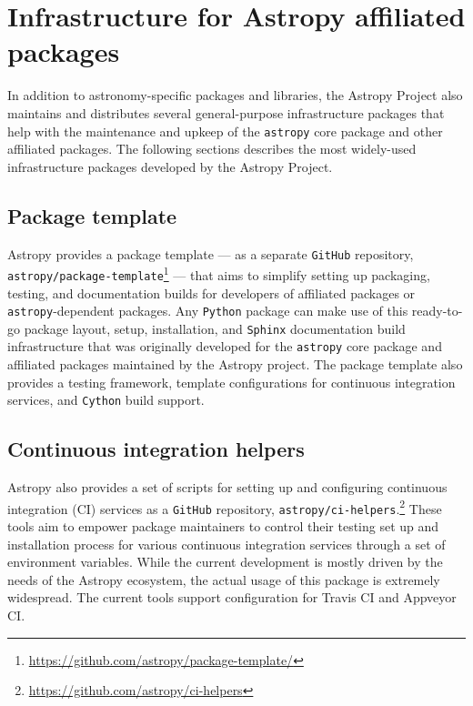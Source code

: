 \documentclass[modern]{aastex61}
\newcommand{\package}[1]{\texttt{#1}\xspace}
\newcommand{\github}{\package{GitHub}}
\newcommand{\python}{\package{Python}}
\newcommand{\astropy}{Astropy\xspace}
\newcommand{\astropypkg}{\package{astropy}}
\newcommand{\inlinecomment}[2]{\todo[inline]{#1: #2}\xspace}
\begin{document}
\section{Infrastructure for Astropy affiliated packages}

\label{sec:infrastructure}

In addition to astronomy-specific packages and libraries, the \astropy Project
also maintains and distributes several general-purpose infrastructure packages
that help with the maintenance and upkeep of the \astropypkg core package and
other affiliated packages.
The following sections describes the most widely-used infrastructure packages
developed by the \astropy Project.

\subsection{Package template}

\astropy provides a package template --- as a separate \github repository,
\package{astropy/package-template}\footnote{\url{https://github.com/astropy/package-template/}}
--- that aims to simplify setting up packaging, testing, and
documentation builds for developers of affiliated packages or
\astropypkg-dependent packages.
Any \python package can make use of this ready-to-go package layout, setup,
installation, and \package{Sphinx} documentation build infrastructure that was
originally developed for the \astropypkg core package and affiliated packages
maintained by the \astropy project.
The package template also provides a testing framework, template configurations
for continuous integration services, and \package{Cython} build support.

\subsection{Continuous integration helpers}

\astropy also provides a set of scripts for setting up and configuring
continuous integration (CI) services as a \github repository,
\package{astropy/ci-helpers}.\footnote{\url{https://github.com/astropy/ci-helpers}}
These tools aim to empower package maintainers to control their testing set up
and installation process for various continuous integration services through a
set of environment variables.
While the current development is mostly driven by the needs of the \astropy
ecosystem, the actual usage of this package is extremely widespread. The current
tools support configuration for Travis CI and Appveyor CI.
\end{document}
